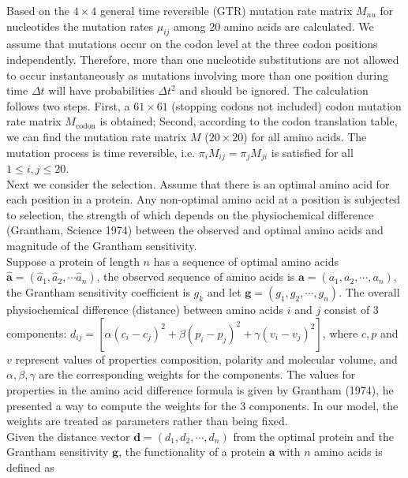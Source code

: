 \documentclass[13pt]{article}
\begin{document}
Based on the $4 \times 4$ general time reversible (GTR) mutation rate matrix $M_{nu}$ for nucleotides the mutation rates $\mu_{ij}$ among 20 amino acids are calculated. We assume that mutations occur on the codon level at the three codon positions independently. Therefore, more than one nucleotide substitutions are not allowed to occur instantaneously as mutations involving more than one position during time $\Delta t$ will have probabilities $\Delta t^2$ and should be ignored. The calculation follows two steps. First, a $61 \times 61$ (stopping codons not included) codon mutation rate matrix $M_{\text{codon}}$ is obtained; Second, according to the codon translation table, we can find the mutation rate matrix $M$ ($20 \times 20$) for all amino acids. The mutation process is time reversible, i.e. $\pi_i M_{ij} = \pi_j M_{ji}$ is satisfied for all $1 \le i, j \le 20$.\\

Next we consider the selection. Assume that there is an optimal amino acid for each position in a protein. Any non-optimal amino acid at a position is subjected to selection, the strength of which depends on the physiochemical difference (Grantham, Science 1974) between the observed and optimal amino acids and magnitude of the Grantham sensitivity. \\

Suppose a protein of length $n$ has a sequence of optimal amino acids $\hat{\mathbf{a}} = (\hat{a}_1, \hat{a}_2, \cdots \hat{a}_n)$, the observed sequence of amino acids is $\mathbf{a} = (a_1, a_2, \cdots, a_n)$, the Grantham sensitivity coefficient is $g_k$ and let $\mathbf{g}=(g_1,g_2,\cdots,g_n)$. The overall physiochemical difference (distance) between amino acids $i$ and $j$ consist of 3 components: $d_{ij} = [\alpha (c_i-c_j)^2 + \beta (p_i - p_j)^2 + \gamma (v_i - v_j)^2]$, where $c, p$ and $v$ represent values of properties composition, polarity and molecular volume, and $\alpha, \beta, \gamma$ are the corresponding weights for the components. The values for properties in the amino acid difference formula is given by Grantham (1974), he presented a way to compute the weights for the 3 components. In our model, the weights are treated as parameters rather than being fixed. \\

Given the distance vector $\mathbf{d} = (d_1, d_2, \cdots, d_n)$ from the optimal protein and the Grantham sensitivity $\mathbf{g}$, the functionality of a protein $\mathbf{a}$ with $n$ amino acids is defined as
\end{document}
